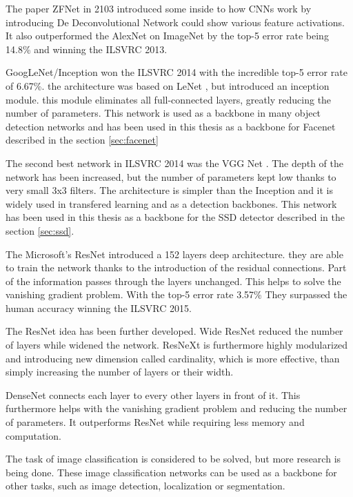 \documentclass[a4paper,12pt,titlepage]{article}
\numberwithin{figure}{section}
\begin{document}
The paper ZFNet \cite{zeiler2014visualizing} in 2103 introduced some inside to how CNNs work by introducing De Deconvolutional Network could show various feature activations. It also outperformed the AlexNet on ImageNet by the top-5 error rate being 14.8\% and winning the ILSVRC 2013.

GoogLeNet/Inception won the ILSVRC 2014 with the incredible top-5 error rate of 6.67\%. the architecture was based on LeNet \cite{lecun1998gradient}, but introduced an inception module. this module eliminates all full-connected layers, greatly reducing the number of parameters. This network is used as a backbone in many object detection networks and has been used in this thesis as a backbone for Facenet \cite{schroff2015facenet} described in the section \ref{sec:facenet}

The second best network in ILSVRC 2014 was the VGG Net \cite{simonyan2014very}. The depth of the network has been increased, but the number of parameters kept low thanks to very small 3x3 filters. The architecture is simpler than the Inception and it is widely used in transfered learning and as a detection backbones. This network has been used in this thesis as a backbone for the SSD detector\cite{liu2016ssd} described in the section \ref{sec:ssd}. 

The Microsoft's ResNet\cite{he2016deep} introduced a 152 layers deep architecture. they are able to train the network thanks to the introduction of the residual connections. Part of the information passes through the layers unchanged. This helps to solve the vanishing gradient problem. With the top-5 error rate 3.57\% They surpassed the human accuracy winning the ILSVRC 2015.

The ResNet idea has been further developed. Wide ResNet\cite{zagoruyko2016wide} reduced the number of layers while widened the network. ResNeXt \cite{xie2017aggregated} is furthermore highly modularized and introducing new dimension called cardinality, which is more effective, than simply increasing the number of layers or their width. 

DenseNet \cite{huang2017densely} connects each layer to every other layers in front of it. This furthermore helps with the vanishing gradient problem and reducing the number of parameters. It outperforms ResNet while requiring less memory and computation.

The task of image classification is considered to be solved, but more research is being done. These image classification networks can be used as a backbone for other tasks, such as image detection, localization or segmentation.
\end{document}
